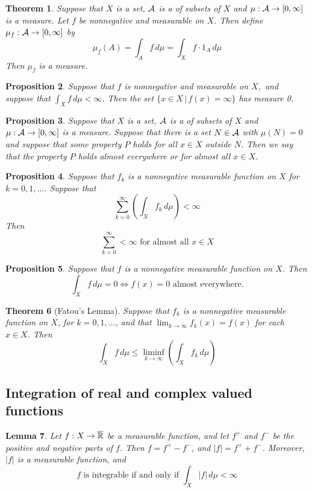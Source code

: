 \documentclass[10pt, oneside, reqno]{amsart}
\theoremstyle{plain}%
\newtheorem{thm}{Theorem}[section]
\newtheorem{lem}[thm]{Lemma}
\newtheorem{prop}[thm]{Proposition}
\theoremstyle{definition}
\theoremstyle{remark}
\newcommand{\given}{ \, | \,}
\newcommand{\dmu}{\, d \mu}
\begin{document}
\begin{thm}
    Suppose that $X$ is a set, $\mathcal{A}$ is a \sig of subsets of $X$ and $\mu: \mathcal{A} \rightarrow [0,\infty]$ is a measure.  Let $f$ be nonnegative and measurable on $X$.  Then define $\mu_f : \mathcal{A} \rightarrow [0,\infty]$ by \[
        \mu_f(A) = \int_A f \dmu = \int_X f \cdot 1_A \dmu
    \]
    Then $\mu_f$ is a measure.
\end{thm}

\begin{prop}
    Suppose that $f$ is nonnegative and measurable on $X,$ and suppose that $\int_X f \dmu < \infty$.  Then the set $\{ x \in X \given f(x) = \infty \}$ has measure 0.
\end{prop}


\begin{prop}
    Suppose that $X$ is a set, $\mathcal{A}$ is a \sig of subsets of $X$ and $\mu: \mathcal{A} \rightarrow [0,\infty]$ is a measure. Suppose that there is a set $N \in \mathcal{A}$ with $\mu(N) = 0$ and suppose that some property $P$ holds for all $x \in X$ outside $N$.  Then we say that the property $P$ holds \emph{almost everywhere} or \emph{for almost all $x \in X$}.
\end{prop}

\begin{prop}
    Suppose that $f_k$ is a nonnegative measurable function on $X$ for $k = 0,1,\dots$.  Suppose that \[
        \sum_{k=0}^\infty \left(\int_X f_k \dmu \right) < \infty
    \]
Then \[
    \sum_{k=0}^\infty < \infty \text{ for almost all $x \in X$}
\]
\end{prop}


\begin{prop}
    Suppose that $f$ is a nonnegative measurable function on $X$.  Then \[
        \int_X f \dmu = 0 \iff f(x) = 0 \text{ almost everywhere.}
    \]
\end{prop}


\begin{thm}[Fatou's Lemma]
    Suppose that $f_k$ is a nonnegative measurable function on $X$, for $k = 0,1,\dots$, and that $\lim_{k \rightarrow \infty} f_k(x) = f(x)$ for each $x \in X$.  Then \[
        \int_X f \dmu \leq \liminf_{k \rightarrow \infty} \left( \int_X f_k \dmu \right)
    \]
    \end{thm}



\subsection{Integration of real and complex valued functions} %
\label{sub:integration_of_real_and_complex_valued_functions}
\begin{lem}
    
    Let $f: X \rightarrow \overline{\mathbb{R}}$ be a measurable function, and let $f^+$ and $f^-$ be the positive and negative parts of $f$.  Then $f = f^+ - f^-$, and $|f| = f^+ + f^-$.  Moreover, $|f|$ is a measurable function, and
    \[
        f \text{ is integrable if and only if } \int_X |f| \dmu < \infty
    \]
\end{lem}
\end{document}
